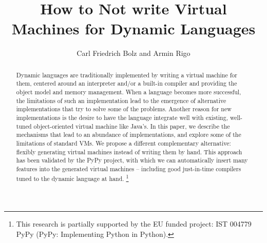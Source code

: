 \documentclass[utf8x]{llncs}
\begin{document}
\pagestyle{headings}

\title{How to Not write Virtual Machines for Dynamic Languages}


\author{Carl Friedrich Bolz and Armin Rigo}




\maketitle

\begin{abstract}

Dynamic languages are traditionally implemented by writing a virtual
machine for them, centered around an interpreter and/or a built-in
compiler and providing the object model and memory management. When
a language becomes more successful, the limitations of such an implementation
lead to the emergence of alternative implementations that try to solve some
of the problems. Another reason for new implementations is the desire to have
the language integrate well with existing, well-tuned object-oriented virtual
machine like Java's. In this paper, we describe the mechanisms that lead to an
abundance of implementations, and explore some of the limitations of standard
VMs.  We propose a different complementary alternative: flexibly generating
virtual machines instead
of writing them by hand.  This approach has been validated by the PyPy
project, with which we can automatically insert many features into the
generated virtual machines -- including good just-in-time compilers tuned
to the dynamic language at hand.
\footnote{This research is partially supported by the EU funded %
 project:
IST 004779 PyPy (PyPy: Implementing Python in Python).} \\

\end{abstract}
\end{document}
